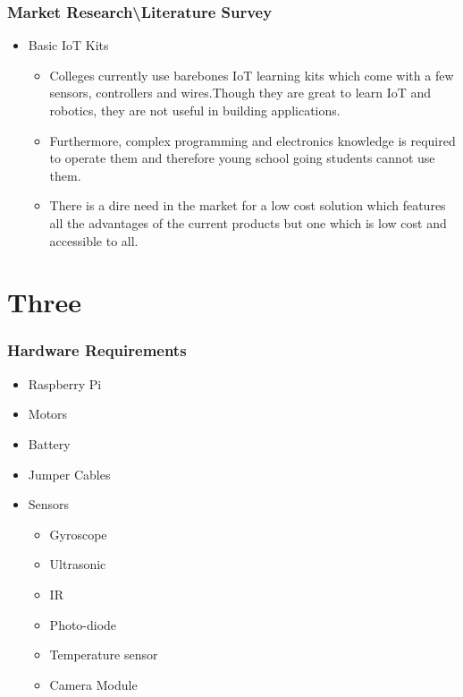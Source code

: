\documentclass{beamer}
\begin{document}
\begin{frame}
\frametitle{Market Research\textbackslash Literature Survey}
\begin{center}
\justifying
\begin{itemize}
\item Basic IoT Kits
\begin{itemize}
\item Colleges currently use barebones IoT learning kits which come with a few sensors, controllers and wires.Though they are great to learn IoT and robotics, they are not useful in building applications.
\item Furthermore, complex programming and electronics knowledge is required to operate them and therefore young school going students cannot use them.
\item There is a dire need in the market for a low cost solution which features all the advantages of the current products but one which is low cost and accessible to all.
\end{itemize}
\end{itemize}
\end{center}
\end{frame}

\section{Three}  
\begin{frame}
\frametitle{Hardware Requirements}
\begin{center}
\justifying
\begin{itemize}
\item Raspberry Pi
\item Motors
\item Battery
\item Jumper Cables
\item Sensors
	\begin{itemize}
	\item Gyroscope
	\item Ultrasonic
	\item IR
	\item Photo-diode
	\item Temperature sensor
	\item Camera Module 
	\end{itemize}	
\end{itemize}
\end{center}
\end{frame}  
\end{document}
